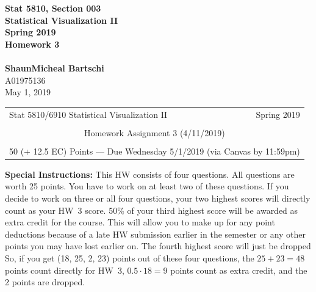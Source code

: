 \documentclass[12pt,letterpaper,final]{article}
\begin{document}


\begin{titlepage}
\vspace*{4.5cm}
\begin{center}
{\LARGE \bf Stat 5810, Section 003} \\[0.5cm]
{\LARGE \bf Statistical Visualization II} \\[0.5cm]
{\LARGE \bf Spring 2019} \\[0.5cm]
{\LARGE \bf Homework 3} \\[0.5cm]
~ \\[2cm]
{\bf ShaunMicheal Bartschi} \\[0.3cm]
{A01975136} \\[0.3cm]
{May 1, 2019} \\[0.3cm]
\end{center}

\thispagestyle{empty}
\vfill
\end{titlepage}

\begin{table}\centering
\begin{tabular*}{6.15in}{@{\extracolsep{\fill}}|llr|} \hline
Stat 5810/6910 Statistical Visualization II  & \hspace*{0.5 in} & Spring 2019 \\
 & & \\
\multicolumn{3}{|c|}{
Homework Assignment 3 (4/11/2019)} \\
 & & \\
\multicolumn{3}{|c|}{
50 (+ 12.5 EC) Points --- Due Wednesday 5/1/2019 (via Canvas by 11:59pm)} \\
\hline
\end{tabular*}
\end{table}


{\Large \bf Special Instructions:} 
This HW consists of four questions. All questions are worth 25 points. You have to work
on at least two of these questions. If you decide to work on three or all four
questions, your two highest scores will directly count as your HW~3 score.
50\% of your third highest score will be awarded as extra credit for the course.
This will allow you to make up for any point deductions because of a late HW
submission earlier in the semester or any other points you may have lost
earlier on. The fourth highest score will just be dropped So, if you get
(18, 25, 2, 23) points out of these four questions, the $25 + 23 = 48$ points
count directly for HW~3, $0.5 \cdot 18 = 9$ points count as extra credit,
and the 2 points are dropped.
\end{document}
